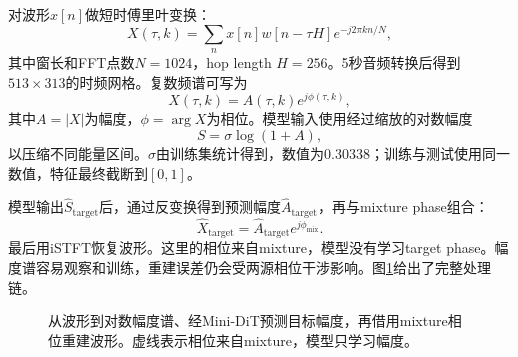 \documentclass[UTF8,12pt,a4paper]{ctexart}
\begin{document}
对波形$x[n]$做短时傅里叶变换：
\begin{equation}
  X(\tau,k)=\sum_n x[n]w[n-\tau H]e^{-j2\pi kn/N},
\end{equation}
其中窗长和FFT点数$N=1024$，hop length $H=256$。5秒音频转换后得到$513\times313$的时频网格。复数频谱可写为
\begin{equation}
  X(\tau,k)=A(\tau,k)e^{j\phi(\tau,k)},
\end{equation}
其中$A=|X|$为幅度，$\phi=\arg X$为相位。模型输入使用经过缩放的对数幅度
\begin{equation}
  S=\sigma\log(1+A),
\end{equation}
以压缩不同能量区间。$\sigma$由训练集统计得到，数值为0.30338；训练与测试使用同一数值，特征最终截断到$[0,1]$。

模型输出$\hat S_{\mathrm{target}}$后，通过反变换得到预测幅度$\hat A_{\mathrm{target}}$，再与mixture phase组合：
\begin{equation}
  \hat X_{\mathrm{target}}=\hat A_{\mathrm{target}}e^{j\phi_{\mathrm{mix}}}.
\end{equation}
最后用iSTFT恢复波形。这里的相位来自mixture，模型没有学习target phase。幅度谱容易观察和训练，重建误差仍会受两源相位干涉影响。图\ref{fig:stft-pipeline}给出了完整处理链。

\begin{figure}[H]
  \centering
  \caption{从波形到对数幅度谱、经Mini-DiT预测目标幅度，再借用mixture相位重建波形。虚线表示相位来自mixture，模型只学习幅度。}
  \label{fig:stft-pipeline}
\end{figure}
\end{document}

